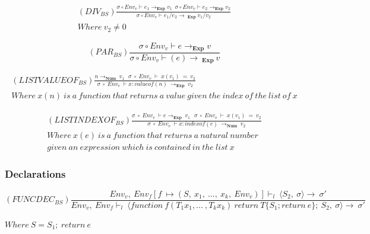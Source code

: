 \begin{equation}
    \begin{split}
        (DIV_{BS})\frac{\sigma \circ Env_v\vdash e_1 \rightarrow _{\textbf{Exp}} v_1 
        \ \ \sigma \circ Env_v \vdash e_2 \rightarrow _{\textbf{Exp}} v_2 }
        {\sigma \circ Env_v \vdash e_1 / e_2 \rightarrow \ _{\textbf{Exp}} \ v_1 / v_2 } \\
        Where \ v_2 \neq 0
    \end{split}
\end{equation}

\begin{equation}
    (PAR_{BS})\frac{\sigma \circ Env_v\vdash e \rightarrow _{\textbf{Exp}} v}
    {\sigma \circ Env_v \vdash (e) \rightarrow \ _{\textbf{Exp}} \ v}
\end{equation}

\begin{equation}
\begin{split}
    (LISTVALUEOF_{BS})\frac{n \rightarrow _{\textbf{Num}} \ v_1 \ \ \  \sigma \ \circ \ Env_v \ \vdash \ x(v_1)\ = \ v_2}
    {\sigma \ \circ \ Env_v\ \vdash x:valueof(n) \ \rightarrow _{\textbf{Exp}} \ v_2} \\
    Where \ x(n) \ is \ a \ function \ that \ returns \ a \ value \ given \ the \ index \ of \ the \ list \ of \ x
\end{split}
\end{equation}

\begin{equation}
\begin{split}
    (LISTINDEXOF_{BS})\frac{\sigma \ \circ \ Env_v\ \vdash e \rightarrow _{\textbf{Exp}} \ v_1 \ \ \  \sigma \ \circ \ Env_v \ \vdash \ x(v_1)\ = \ v_2}
    {\sigma \ \circ \ Env_v\ \vdash x:indexof(e) \ \rightarrow _{\textbf{Num}} \ v_2} \\
    Where \ x(e) \ is \ a \ function \ that \ returns \ a \ natural \ number \\ given \ an \ expression \ which \ is \ contained \ in \ the \ list \ x
\end{split}
\end{equation}

\subsubsection{Declarations}

\begin{equation} 
    (FUNCDEC_{BS})\frac{Env_v, \ Env_f[f \ \mapsto  (S, \ x_1, \ ..., \ x_k, \ Env_v)] \vdash _l \ \langle S_2, \ \sigma \rangle \rightarrow \ \sigma' }{Env_v, \  Env_f \vdash _l \ \langle function \ f(T_1 x_1, ... \ , T_k x_k) 
\ return \ T \{ S_1 ; return \ e\} ; \ S_2 , \ \sigma \rangle \rightarrow \ \sigma'}
\end{equation} 
\begin{center}
    $Where \ S = S_1 ; \ return \ e$
\end{center}

